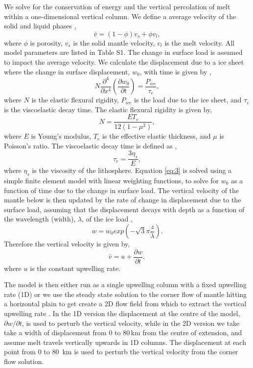 \documentclass[draft,grl]{agutexSI2018}
\begin{document}
\begin{article}
We solve for the conservation of energy and the vertical percolation of melt within a one-dimensional vertical column. We define a average velocity of the solid and liquid phases \citep{scott-1992},
\begin{equation}
\bar{v} = (1-\phi)v_{s} + \phi v_{l},
\label{eq:2}
\end{equation}
where $\phi$ is porosity, $v_{s}$ is the solid mantle velocity, $v_{l}$ is the melt velocity. All model parameters are listed in Table S1. The change in surface load is assumed to impact the average velocity. We calculate the displacement due to a ice sheet where the change in surface displacement, $w_{0}$, with time is given by \citep{sleep-1976},
\begin{equation}
N\frac{\partial^{4}}{\partial x^{4}} \left(\frac{\partial w_{0}}{\partial t} \right) = \frac{P_{ice}}{\tau_{e}},
\label{eq:3}
\end{equation}
where $N$ is the elastic flexural rigidity, $P_{ice}$ is the load due to the ice sheet, and $\tau_{e}$ is the viscoelastic decay time. The elastic flexural rigidity is given by,
\begin{equation}
N = \frac{E T_{e}}{12(1-\mu^{2})},
\label{eq:4}
\end{equation}
where $E$ is Young's modulus, $T_{e}$ is the effective elastic thickness, and $\mu$ is Poisson's ratio. The viscoelastic decay time is defined as \citep{sleep-1976},
\begin{equation}
\tau_{e} = \frac{3\eta_{s}}{E},
\label{eq:5}
\end{equation}
where $\eta_{s}$ is the viscosity of the lithosphere. Equation \ref{eq:3} is solved using a simple finite element model with linear weighting functions, to solve for $w_{0}$ as a function of time due to the change in surface load. The vertical velocity of the mantle below is then updated by the rate of change in displacement due to the surface load, assuming that the displacement decays with depth as a function of the wavelength (width), $\lambda$, of the ice load \citep{england-etal-1985},
\begin{equation}
w = w_{0} exp\left(-\sqrt{3}\pi \frac{z}{\lambda}\right).
\label{eq:6}
\end{equation}
Therefore the vertical velocity is given by,
\begin{equation}
\bar{v} = u + \frac{\partial w}{\partial t},
\label{eq:7}
\end{equation}
where $u$ is the constant upwelling rate.

The model is then either run as a single upwelling column with a fixed upwelling rate (1D) or we use the steady state solution to the corner flow of mantle hitting a horizontal plain to get create a 2D flow field from which to extract the vertical upwelling rate \citep{silbeck-1975}. In the 1D version the displacement at the centre of the model, $\partial w/\partial t$, is used to perturb the vertical velocity, while in the 2D version we take take a width of displacement from 0 to 80\,km from the centre of extension, and assume melt travels vertically upwards in 1D columns. The displacement at each point from 0 to 80 \,km is used to perturb the vertical velocity from the corner flow solution.


\end{article}
\end{document}
